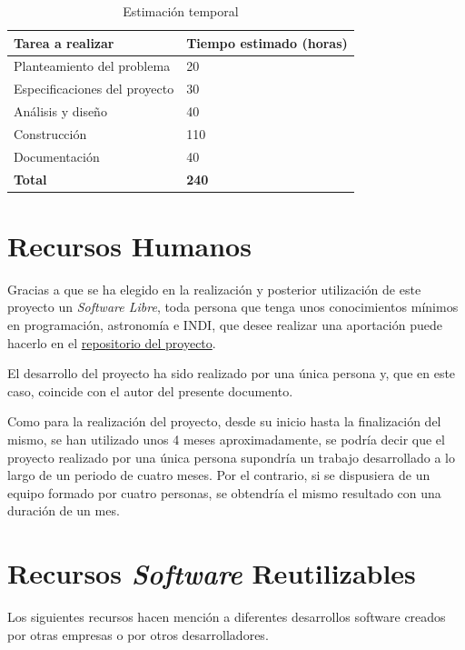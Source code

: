 \begin{table}[h]
\centering
\label{table:tiempoEstimado}
\begin{tabular}{ll}
\hline
{\bf Tarea a realizar}                   & {\bf Tiempo estimado (horas)} \\ \hline
Planteamiento del problema    & 20                            \\
Especificaciones del proyecto & 30                            \\
Análisis y diseño             & 40                            \\
Construcción                  & 110                           \\
Documentación                 & 40                            \\
{\bf Total}                   & {\bf 240}                           \\ \hline
\end{tabular}
\caption{Estimación temporal}
\end{table}


\section{Recursos Humanos}
Gracias a que se ha elegido en la realización y posterior utilización de este proyecto un \textit{Software Libre}, toda persona que tenga unos conocimientos mínimos en programación, astronomía e INDI, que desee realizar una aportación puede hacerlo en el \href{https://github.com/PabloTorrecillas/IndiWebClient}{repositorio del proyecto}.

El desarrollo del proyecto ha sido realizado por una única persona y, que en este caso, coincide con el autor del presente documento.

Como para la realización del proyecto, desde su inicio hasta la finalización del mismo, se han utilizado unos 4 meses aproximadamente, se podría decir que el proyecto realizado por una única persona supondría un trabajo desarrollado a lo largo de un periodo de cuatro meses. Por el contrario, si se dispusiera de un equipo formado por cuatro personas, se obtendría el mismo resultado con una duración de un mes.

\section{Recursos \textit{Software} Reutilizables}
Los siguientes recursos hacen mención a diferentes desarrollos software creados por otras empresas o por otros desarrolladores.

